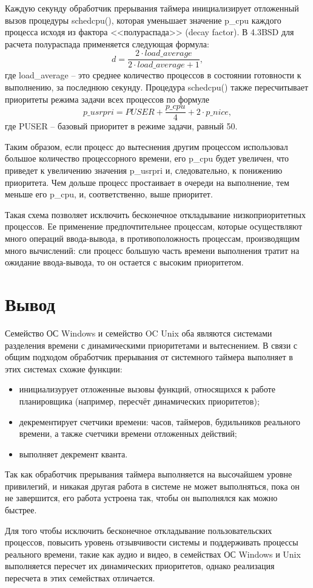 Каждую секунду обработчик прерывания таймера инициализирует отложенный вызов процедуры {\ttfamily schedcpu()}, которая уменьшает значение {\ttfamily p{\_}cpu} каждого процесса исходя из фактора <<полураспада>> (decay factor). В {\ttfamily 4.3BSD} для расчета полураспада применяется следующая формула:
\[
d = \frac{2\cdot load{\_}average}{2\cdot load{\_}average + 1},
\]
где  {\ttfamily load{\_}average} -- это среднее количество процессов в состоянии готовности к выполнению, за последнюю секунду. Процедура {\ttfamily schedcpu()} также пересчитывает приоритеты режима задачи всех процессов по формуле
\[
{p\_usrpri} = PUSER + \frac{p{\_}cpu}{4} + 2\cdot {p{\_}nice},
\]
где {\ttfamily PUSER} -- базовый приоритет в режиме задачи, равный 50.

Таким образом, если процесс до вытеснения другим процессом использовал большое количество процессорного времени, его {\ttfamily p{\_}cpu} будет увеличен, что приведет к увеличению значения {\ttfamily p{\_}usrpri} и, следовательно, к понижению приоритета. Чем дольше процесс простаивает в очереди на выполнение, тем меньше его {\ttfamily p{\_}cpu}, и, соответственно, выше приоритет. 

Такая схема позволяет исключить бесконечное откладывание низкоприоритетных процессов. Ее применение предпочтительнее процессам, которые осуществляют много операций ввода-вывода, в противоположность процессам, производящим много вычислений: сли процесс большую часть времени выполнения тратит на ожидание ввода-вывода, то он остается с высоким приоритетом.



\chapter*{Вывод}

Семейство ОС Windows и семейство OC Unix оба являются системами разделения времени с динамическими приоритетами и вытеснением. В связи с общим подходом обработчик прерывания от системного таймера выполняет в этих системах схожие функции: 

\begin{itemize}
	\item инициализурует отложенные вызовы функций, относящихся к работе планировщика (например, пересчёт динамических приоритетов);
	\item декрементирует счетчики времени: часов, таймеров, будильников реального времени, а также счетчики времени отложенных действий;
	\item выполняет декремент кванта.
\end{itemize}

Так как обработчик прерывания таймера выполняется на высочайшем уровне привилегий, и никакая другая работа в системе не может выполняться, пока он не завершится, его работа устроена так, чтобы он выполнялся как можно быстрее. 
  
Для того чтобы исключить бесконечное откладывание пользовательских процессов, повысить уровень отзывчивости системы и поддерживать процессы реального времени, такие как аудио и видео, в семействах ОС Windows и Unix выполняется пересчет их динамических приоритетов, однако реализация пересчета в этих семействах отличается. 



